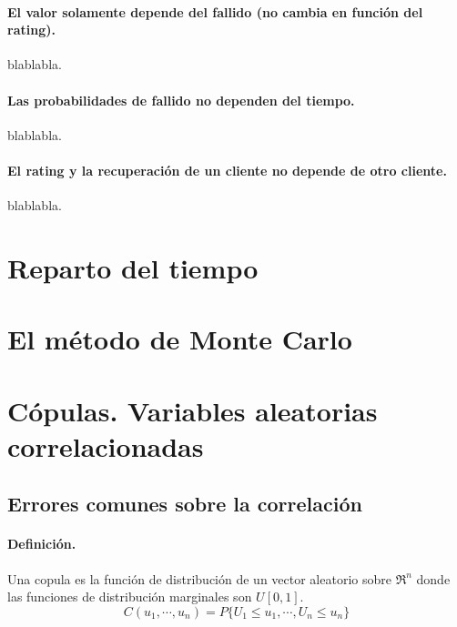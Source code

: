 \paragraph{El valor solamente depende del fallido (no cambia en funci\'on del rating).}
blablabla.

\paragraph{Las probabilidades de fallido no dependen del tiempo.}
blablabla.

\paragraph{El rating y la recuperaci\'on de un cliente no depende de otro cliente.}
blablabla.



\section{Reparto del tiempo}



\section{El m\'etodo de Monte Carlo}




\section{C\'opulas. Variables aleatorias correlacionadas}

\subsection{Errores comunes sobre la correlaci\'on}

\paragraph{Definici\'on.}
Una copula es la funci\'on de distribuci\'on de un vector aleatorio sobre 
$\Re^n$ donde las funciones de distribuci\'on marginales son $U[0,1]$. 
\begin{displaymath}
C(u_1, \cdots, u_n) = P\{U_1 \leq u_1, \cdots, U_n \leq u_n\}
\end{displaymath}

